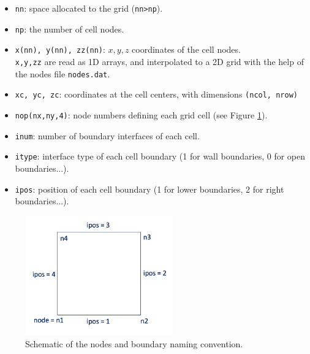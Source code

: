 \documentclass{article}
\newcommand{\code}[1]{\texttt{#1}}
\begin{document}
\begin{itemize}
	\item \code{nn}: space allocated to the grid (\code{nn>np}).
	\item  \code{np}:  the number of cell nodes. 
	\item \code{x(nn), y(nn), zz(nn)}: $x,y,z$ coordinates of the cell nodes.  \\[0.1cm]
		\code{x,y,zz} are read as 1D arrays, and interpolated to a 2D grid with the help of the nodes file \code{nodes.dat}.
		\item  \code{xc, yc, zc}: coordinates at the cell centers, with dimensions \code{(ncol, nrow)}

	\item \code{nop(nx,ny,4)}: node numbers defining each grid cell (see Figure \ref{nodes}).  

	\item \code{inum}: number of boundary interfaces of each cell.
	\item \code{itype}:  interface type of each cell boundary (1 for wall boundaries, 0 for open boundaries...).  
	\item \code{ipos}: position of each cell boundary (1 for lower boundaries, 2 for right boundaries...).
\end{itemize}


 \begin{figure}[h]
 \centering
\includegraphics[width=15pc]{grid/boundaries.png}
 \caption{Schematic of the nodes and boundary naming convention. }
 \label{nodes}
 \end{figure}
 
\end{document}
